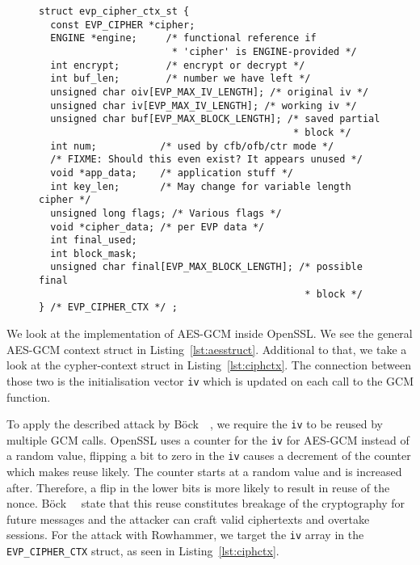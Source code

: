 \begin{figure}
\begin{minipage}{\linewidth}
\begin{lstlisting}[style=CStyle,
                   caption={Context struct describing the Cipher used in TLS.
This struct is used as the SSL context inside OpenSSL. Source is taken from
OpenSSL version $1.1.0g$},
                   label={lst:ciphctx}]
struct evp_cipher_ctx_st {
  const EVP_CIPHER *cipher;
  ENGINE *engine;     /* functional reference if
                       * 'cipher' is ENGINE-provided */
  int encrypt;        /* encrypt or decrypt */
  int buf_len;        /* number we have left */
  unsigned char oiv[EVP_MAX_IV_LENGTH]; /* original iv */
  unsigned char iv[EVP_MAX_IV_LENGTH]; /* working iv */
  unsigned char buf[EVP_MAX_BLOCK_LENGTH]; /* saved partial
                                            * block */
  int num;           /* used by cfb/ofb/ctr mode */
  /* FIXME: Should this even exist? It appears unused */
  void *app_data;    /* application stuff */
  int key_len;       /* May change for variable length cipher */
  unsigned long flags; /* Various flags */
  void *cipher_data; /* per EVP data */
  int final_used;
  int block_mask;
  unsigned char final[EVP_MAX_BLOCK_LENGTH]; /* possible final
                                              * block */
} /* EVP_CIPHER_CTX */ ;
\end{lstlisting}
\end{minipage}
\end{figure}

We look at the implementation of AES-GCM inside OpenSSL. We see the general
AES-GCM context struct in Listing~\ref{lst:aesstruct}. Additional to that, we
take a look at the cypher-context struct in Listing~\ref{lst:ciphctx}. The
connection between those two is the initialisation vector \texttt{iv} which is
updated on each call to the GCM function.

To apply the described attack by Böck~\etal~\cite{gcmnonceattack}, we require
the \texttt{iv} to be reused by multiple GCM calls. OpenSSL uses a counter for
the \texttt{iv} for AES-GCM instead of a random value, flipping a bit to zero in
the \texttt{iv} causes a decrement of the counter which makes reuse likely. The
counter starts at a random value and is increased after. Therefore, a flip in
the lower bits is more likely to result in reuse of the nonce.
Böck~\etal~\cite{gcmnonceattack} state that this reuse constitutes breakage of
the cryptography for future messages and the attacker can craft valid
ciphertexts and overtake sessions. For the attack with Rowhammer, we target the
\texttt{iv} array in the \texttt{EVP\_CIPHER\_CTX} struct, as seen in
Listing~\ref{lst:ciphctx}.


